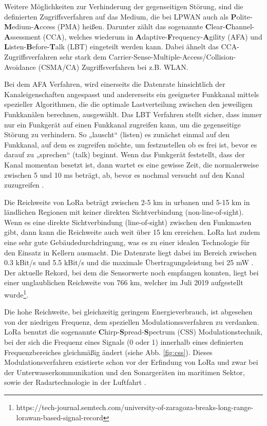 Weitere Möglichkeiten zur Verhinderung der gegenseitigen Störung, sind die definierten Zugriffsverfahren auf das Medium, die bei LPWAN auch als \textbf{P}olite-\textbf{M}edium-\textbf{A}ccess (PMA) heißen. Darunter zählt das sogenannte \textbf{C}lear-\textbf{C}hannel-\textbf{A}ssessment (CCA), welches wiederum in \textbf{A}daptive-\textbf{F}requency-\textbf{A}gility (AFA) und \textbf{L}isten-\textbf{B}efore-\textbf{T}alk (LBT) eingeteilt werden kann. Dabei ähnelt das CCA-Zugriffsverfahren sehr stark dem Carrier-Sense-Multiple-Access/Collision-Avoidance (CSMA/CA) Zugriffsverfahren bei z.B. WLAN.

Bei dem AFA Verfahren, wird einerseits die Datenrate hinsichtlich der Kanaleigenschaften angespasst und andererseits ein geeigneter Funkkanal mittels spezieller Algorithmen, die die optimale Lastverteilung zwischen den jeweiligen Funkkanälen berechnen, ausgewählt. Das LBT Verfahren stellt sicher, dass immer nur ein Funkgerät auf einen Funkkanal zugreifen kann, um die gegenseitige Störung zu verhindern. So „lauscht“ (listen) es zunächst einmal auf den Funkkanal, auf dem es zugreifen möchte, um festzustellen ob es frei ist, bevor es darauf zu „sprechen“ (talk) beginnt. Wenn das Funkgerät feststellt, dass der Kanal momentan besetzt ist, dann wartet es eine gewisse Zeit, die normalerweise zwischen 5 und 10 ms beträgt, ab, bevor es nochmal versucht auf den Kanal zuzugreifen \cite{Staniec2020}. 

Die Reichweite von LoRa beträgt zwischen 2-5 km in urbanen und 5-15 km in ländlichen Regionen mit keiner direkten Sichtverbindung (non-line-of-sight). Wenn es eine direkte Sichtverbindung (line-of-sight) zwischen den Funkmasten gibt, dann kann die Reichweite auch weit über 15 km erreichen. LoRa hat zudem eine sehr gute Gebäudedurchdringung, was es zu einer idealen Technologie für den Einsatz in Kellern ausmacht. Die Datenrate liegt dabei im Bereich zwischen 0.3 kBit/s  und 5.5 kBit/s und die maximale Übertragungsleistung bei 25 mW \cite{lora2022}. Der aktuelle Rekord, bei dem die Sensorwerte noch empfangen konnten, liegt bei einer unglaublichen Reichweite von 766 km, welcher im Juli 2019 aufgestellt wurde\footnote{https://tech-journal.semtech.com/university-of-zaragoza-breaks-long-range-lorawan-based-signal-record}.

Die hohe Reichweite, bei gleichzeitig geringem Energieverbrauch, ist abgesehen von der niedrigen Frequenz, dem speziellen Modulationssverfahren zu verdanken. LoRa benutzt die sogenannte \textbf{C}hirp-\textbf{S}pread-\textbf{S}pectrum (CSS) Modulationstechnik, bei der sich die Frequenz eines Signals (0 oder 1) innerhalb eines definierten Frequenzbereiches gleichmäßig ändert (siehe Abb. \ref{fig:css}). Dieses Modulationsverfahren existierte schon vor der Erfindung von LoRa und zwar bei der Unterwasserkommunikation und den Sonargeräten im maritimen Sektor, sowie der Radartechnologie in der Luftfahrt \cite{semtech2020}.

